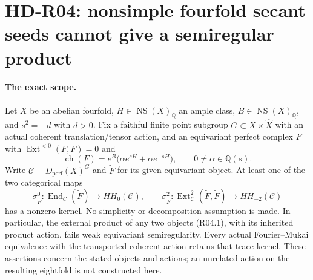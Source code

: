 \section{HD-R04: nonsimple fourfold secant seeds cannot give a semiregular product}
\label{sec:nonsimple-secant-general}

\paragraph{The exact scope.}
Let $X$ be an abelian fourfold, $H\in\operatorname{NS}(X)_{\mathbb Q}$
an ample class, $B\in\operatorname{NS}(X)_{\mathbb Q}$, and $s^2=-d$
with $d>0$. Fix a faithful finite point subgroup
$G\subset X\times\widehat X$ with an actual coherent translation/tensor
action, and an equivariant perfect complex $F$ with
$\operatorname{Ext}^{<0}(F,F)=0$ and
\[
 \operatorname{ch}(F)
   =e^B\bigl(\alpha e^{sH}+\bar\alpha e^{-sH}\bigr),
                   \qquad 0\ne\alpha\in\mathbb Q(s).       \tag{R04.1}
\]
Write $\mathcal C=D_{\mathrm{perf}}(X)^G$ and $\widetilde F$ for
its given equivariant object. At least one of the two categorical maps
\[
 \sigma^0_{\widetilde F}:\operatorname{End}_{\mathcal C}(\widetilde F)
                       \longrightarrow HH_0(\mathcal C),\qquad
 \sigma^2_{\widetilde F}:\operatorname{Ext}^2_{\mathcal C}
                   (\widetilde F,\widetilde F)
                       \longrightarrow HH_{-2}(\mathcal C)
                                                               \tag{R04.2}
\]
has a nonzero kernel. No simplicity or decomposition assumption is made.
In particular, the external product of any two objects (R04.1), with
its inherited product action, fails weak equivariant semiregularity.
Every actual Fourier--Mukai equivalence with the transported coherent
action retains that trace kernel. These assertions concern the stated
objects and actions; an unrelated action on the resulting eightfold
is not constructed here.

